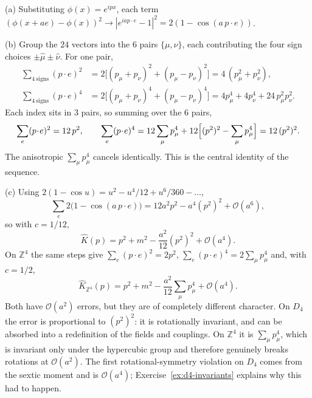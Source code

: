 {(a) Substituting $\phi(x)=e^{ipx}$, each term
$(\phi(x+ae)-\phi(x))^2 \to |e^{iap\cdot e}-1|^2 = 2(1-\cos(a\,p\!\cdot\!e))$.

(b) Group the $24$ vectors into the $6$ pairs $\{\mu,\nu\}$, each contributing
the four sign choices $\pm\hat\mu\pm\hat\nu$. For one pair,
\begin{align}
  \sum_{4\ \text{signs}} (p\!\cdot\!e)^2
    &= 2\bigl[(p_\mu+p_\nu)^2+(p_\mu-p_\nu)^2\bigr] = 4\,(p_\mu^2+p_\nu^2),\\
  \sum_{4\ \text{signs}} (p\!\cdot\!e)^4
    &= 2\bigl[(p_\mu+p_\nu)^4+(p_\mu-p_\nu)^4\bigr]
     = 4p_\mu^4+4p_\nu^4+24\,p_\mu^2p_\nu^2 .
\end{align}
Each index sits in $3$ pairs, so summing over the $6$ pairs,
\begin{equation}
  \sum_e (p\!\cdot\!e)^2 = 12\,p^2, \qquad
  \sum_e (p\!\cdot\!e)^4 = 12\sum_\mu p_\mu^4
      + 12\Bigl[(p^2)^2-\sum_\mu p_\mu^4\Bigr] = 12\,(p^2)^2 .
\end{equation}
The anisotropic $\sum_\mu p_\mu^4$ cancels identically. This is the central
identity of the sequence.

(c) Using $2(1-\cos u) = u^2 - u^4/12 + u^6/360 - \dots$,
\begin{equation}
  \sum_e 2\bigl(1-\cos(a\,p\!\cdot\!e)\bigr)
    = 12a^2p^2 - a^4 (p^2)^2 + \mathcal{O}(a^6),
\end{equation}
so with $c=1/12$,
\begin{equation}
  \widehat{K}(p) = p^2 + m^2 - \frac{a^2}{12}(p^2)^2 + \mathcal{O}(a^4).
\end{equation}
On $\mathbb{Z}^4$ the same steps give
$\sum_e (p\!\cdot\!e)^2 = 2p^2$, $\sum_e (p\!\cdot\!e)^4 = 2\sum_\mu p_\mu^4$
and, with $c=1/2$,
\begin{equation}
  \widehat{K}_{\mathbb{Z}^4}(p)
    = p^2 + m^2 - \frac{a^2}{12}\sum_\mu p_\mu^4 + \mathcal{O}(a^4).
\end{equation}
Both have $\mathcal{O}(a^2)$ errors, but they are of completely different
character. On $D_4$ the error is proportional to $(p^2)^2$: it is rotationally
invariant, and can be absorbed into a redefinition of the fields and couplings.
On $\mathbb{Z}^4$ it is $\sum_\mu p_\mu^4$, which is invariant only under the
hypercubic group and therefore genuinely breaks rotations at
$\mathcal{O}(a^2)$. The first rotational-symmetry violation on $D_4$ comes from
the sextic moment and is $\mathcal{O}(a^4)$;
Exercise~\ref{ex:d4-invariants} explains why this had to happen.}

